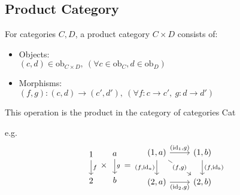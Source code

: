 \subsection{Product Category}
For categories $C,D$, a product category $C\times D$ consists of:
\parencite{awodey:category_theory}
\begin{itemize}
  \item Objects:\\
    $(c, d) \in \mathrm{ob}_{C\times D},\ (\forall c \in \mathrm{ob}_C, d \in \mathrm{ob}_D)$
  \item Morphisms:\\
    $(f,g) : (c,d) \to (c', d'),\ (\forall f: c \to c',\ g:d \to d')$
\end{itemize}
This operation is the product in the category of categories Cat

e.g.
\[
  \begin{tikzcd}
    1 \\
    2
    \arrow["f", from=1-1, to=2-1]
  \end{tikzcd}
  \times
  \begin{tikzcd}
    a \\
    b
    \arrow["g", from=1-1, to=2-1]
  \end{tikzcd}
  =
  \begin{tikzcd}
    {(1,a)} & {(1,b)} \\
    {(2,a)} & {(2,b)}
    \arrow["{(\mathrm{id}_1,g)}", from=1-1, to=1-2]
    \arrow["{(f,\mathrm{id}_a)}"', from=1-1, to=2-1]
    \arrow["{(\mathrm{id}_2,g)}"', from=2-1, to=2-2]
    \arrow["{(f,\mathrm{id}_b)}", from=1-2, to=2-2]
    \arrow["{(f,g)}"{description}, from=1-1, to=2-2]
  \end{tikzcd}
\]